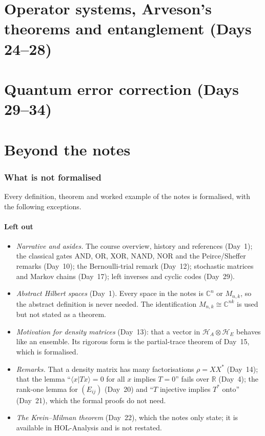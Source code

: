 \documentclass[11pt,a4paper]{article}
\newcommand{\C}{\mathbb{C}}
\theoremstyle{definition}
\begin{document}
\part{Operator systems, Arveson's theorems and entanglement (Days 24--28)}








\part{Quantum error correction (Days 29--34)}







\part{Beyond the notes}


\appendix
\section{What is not formalised}

Every definition, theorem and worked example of the notes is formalised, with the following
exceptions.

\subsection*{Left out}
\begin{itemize}
\item \emph{Narrative and asides.}  The course overview, history and references (Day~1); the
  classical gates AND, OR, XOR, NAND, NOR and the Peirce/Sheffer remarks (Day~10); the
  Bernoulli-trial remark (Day~12); stochastic matrices and Markov chains (Day~17); left inverses
  and cyclic codes (Day~29).
\item \emph{Abstract Hilbert spaces} (Day~1).  Every space in the notes is $\C^n$ or
  $M_{n,k}$, so the abstract definition is never needed.  The identification
  $M_{n,k}\cong\C^{nk}$ is used but not stated as a theorem.
\item \emph{Motivation for density matrices} (Day~13): that a vector in
  $\mathcal H_A\otimes\mathcal H_E$ behaves like an ensemble.  Its rigorous form is the
  partial-trace theorem of Day~15, which is formalised.
\item \emph{Remarks.}  That a density matrix has many factorisations $\rho=XX^*$ (Day~14); that
  the lemma ``$\langle x|Tx\rangle=0$ for all $x$ implies $T=0$'' fails over $\mathbb R$ (Day~4);
  the rank-one lemma for $(E_{ij})$ (Day~20) and ``$T$ injective implies $T^*$ onto''
  (Day~21), which the formal proofs do not need.
\item \emph{The Krein--Milman theorem} (Day~22), which the notes only state; it is available
  in HOL-Analysis and is not restated.
\end{itemize}
\end{document}
